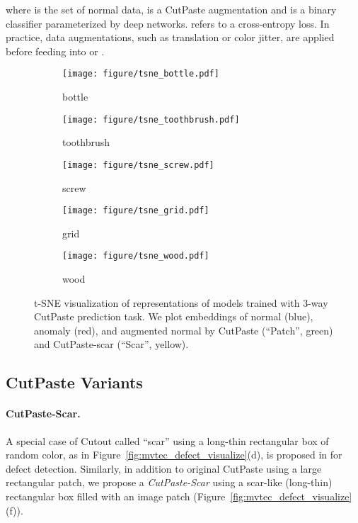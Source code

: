 \documentclass[final]{cvpr}
\begin{document}
where  is the set of normal data,  is a CutPaste augmentation and  is a binary classifier parameterized by deep networks.  refers to a cross-entropy loss. In practice, data augmentations, such as translation or color jitter, are applied before feeding  into  or .



\begin{figure*}[t]
    \centering
    \begin{subfigure}{.17\textwidth}
    \centering
    \texttt{[image: figure/tsne\_bottle.pdf]}
    \caption{bottle}
    \label{fig:tsne_bottle}
    \end{subfigure}
    \begin{subfigure}{.17\textwidth}
    \centering
    \texttt{[image: figure/tsne\_toothbrush.pdf]}
    \caption{toothbrush}
    \label{fig:tsne_toothbrush}
    \end{subfigure}
    \begin{subfigure}{.17\textwidth}
    \centering
    \texttt{[image: figure/tsne\_screw.pdf]}
    \caption{screw}
    \label{fig:tsne_screw}
    \end{subfigure}
    \begin{subfigure}{.17\textwidth}
    \centering
    \texttt{[image: figure/tsne\_grid.pdf]}
    \caption{grid}
    \label{fig:tsne_grid}
    \end{subfigure}
    \begin{subfigure}{.17\textwidth}
    \centering
    \texttt{[image: figure/tsne\_wood.pdf]}
    \caption{wood}
    \label{fig:tsne_wood}
    \end{subfigure}
    \vspace{-0.1in}
    \caption{t-SNE visualization of representations of models trained with 3-way CutPaste prediction task. We plot embeddings of normal (blue), anomaly (red), and augmented normal by CutPaste (``Patch'', green) and CutPaste-scar (``Scar'', yellow). }
    \label{fig:tsne}
    \vspace{-0.15in}
\end{figure*}


\subsection{CutPaste Variants}
\label{sec:method_cutpaste_multiclass}

\paragraph{CutPaste-Scar.}
A special case of Cutout called ``scar'' using a long-thin rectangular box of random color, as in Figure~\ref{fig:mvtec_defect_visualize}(d), is proposed in \cite{scar2020} for defect detection. 
Similarly, in addition to original CutPaste using a large rectangular patch, we propose a \emph{CutPaste-Scar} using a scar-like (long-thin) rectangular box filled with an image patch (Figure~\ref{fig:mvtec_defect_visualize}(f)).
\end{document}
